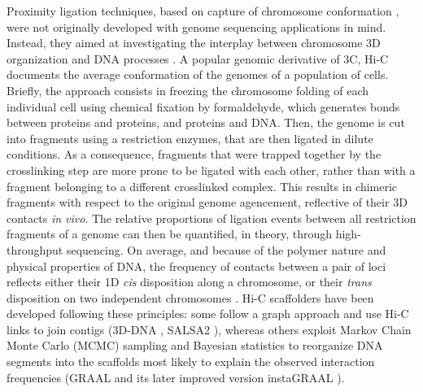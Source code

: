 Proximity ligation techniques, based on capture of chromosome conformation \cite{Dekker2002}, were not originally developed with genome sequencing applications in mind. Instead, they aimed at investigating the interplay between chromosome 3D organization and DNA processes \cite{dekker2013exploring}. A popular genomic derivative of 3C, Hi-C \cite{Lieberman-Aiden2009} documents the average conformation of the genomes of a population of cells. Briefly, the approach consists in freezing the chromosome folding of each individual cell using chemical fixation by formaldehyde, which generates bonds between proteins and proteins, and proteins and DNA. Then, the genome is cut into fragments using a restriction enzymes, that are then ligated in dilute conditions. As a consequence, fragments that were trapped together by the crosslinking step are more prone to be ligated with each other, rather than with a fragment belonging to a different crosslinked complex. This results in chimeric fragments with respect to the original genome agencement, reflective of their 3D contacts \textit{in vivo}. The relative proportions of ligation events between all restriction fragments of a genome can then be quantified, in theory, through high-throughput sequencing. On average, and because of the polymer nature and physical properties of DNA, the frequency of contacts between a pair of loci reflects either their 1D \textit{cis} disposition along a chromosome, or their \textit{trans} disposition on two independent chromosomes \cite{flot2015contact, oddes2018}. Hi-C scaffolders have been developed following these principles: some follow a graph approach and use Hi-C links to join contigs (3D-DNA \cite{3d-dna}, SALSA2 \cite{salsa2}), whereas others exploit Markov Chain Monte Carlo (MCMC) sampling and Bayesian statistics to reorganize DNA segments into the scaffolds most likely to explain the observed interaction frequencies (GRAAL \cite{graal} and its later improved version instaGRAAL \cite{instagraal}). \\

